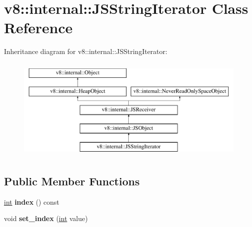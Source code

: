 \hypertarget{classv8_1_1internal_1_1JSStringIterator}{}\section{v8\+:\+:internal\+:\+:J\+S\+String\+Iterator Class Reference}
\label{classv8_1_1internal_1_1JSStringIterator}
Inheritance diagram for v8\+:\+:internal\+:\+:J\+S\+String\+Iterator\+:\begin{figure}[H]
\begin{center}
\leavevmode
\includegraphics[height=5.000000cm]{classv8_1_1internal_1_1JSStringIterator}
\end{center}
\end{figure}
\subsection*{Public Member Functions}
\begin{DoxyCompactItemize}
\item 
\mbox{\label{classv8_1_1internal_1_1JSStringIterator_aecd1063db9e5f6c332c726b5dd5b6ea4}} 
\mbox{\hyperlink{classint}{int}} {\bfseries index} () const
\item 
\mbox{\label{classv8_1_1internal_1_1JSStringIterator_a1123e3d79ddc8d99396e293693512a52}} 
void {\bfseries set\+\_\+index} (\mbox{\hyperlink{classint}{int}} value)
\end{DoxyCompactItemize}

